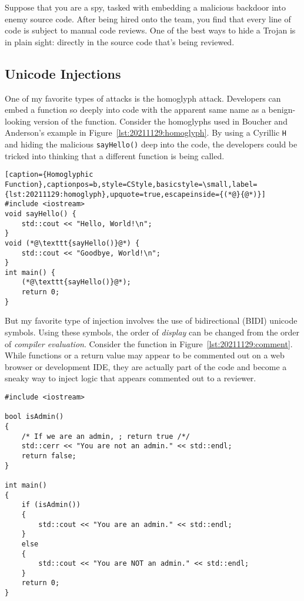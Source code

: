 Suppose that you are a spy, tasked with embedding a malicious backdoor into enemy source code. After being hired onto the team, you find that every line of code is subject to manual code reviews. One of the best ways to hide a Trojan is in plain sight: directly in the source code that's being reviewed.

\subsection{Unicode Injections}
One of my favorite types of attacks is the homoglyph attack.\autocite{20211129:hood} Developers can embed a function so deeply into code with the apparent same name as a benign-looking version of the function. Consider the homoglyphs used in Boucher and Anderson's example in Figure~\ref{lst:20211129:homoglyph}.\autocite{20211129:boucher} By using a Cyrillic \texttt{Н} and hiding the malicious \texttt{sayНello()} deep into the code, the developers could be tricked into thinking that a different function is being called.

\begin{lstlisting}[caption={Homoglyphic Function},captionpos=b,style=CStyle,basicstyle=\small,label={lst:20211129:homoglyph},upquote=true,escapeinside={(*@}{@*)}]
#include <iostream>
void sayHello() {
	std::cout << "Hello, World!\n";
}
void (*@\texttt{sayНello()}@*) {
	std::cout << "Goodbye, World!\n";
}
int main() {
	(*@\texttt{sayНello()}@*);
	return 0;
}
\end{lstlisting}

But my favorite type of injection involves the use of bidirectional (BIDI) unicode symbols. Using these symbols, the order of \textit{display} can be changed from the order of \textit{compiler evaluation}. Consider the function in Figure~\ref{lst:20211129:comment}. While functions or a return value may appear to be commented out on a web browser or development IDE, they are actually part of the code and become a sneaky way to inject logic that appears commented out to a reviewer.

\begin{lstlisting}[caption={Comment Reordering},captionpos=b,style=CStyle,basicstyle=\small,label={lst:20211129:comment},upquote=true]
#include <iostream>

bool isAdmin()
{
	/* If we are an admin, ⁧ /*/ return true ;
	std::cerr << "You are not an admin." << std::endl;
	return false;
}

int main()
{
	if (isAdmin())
	{
		std::cout << "You are an admin." << std::endl;
	}
	else
	{
		std::cout << "You are NOT an admin." << std::endl;
	}
	return 0;
}
\end{lstlisting}
